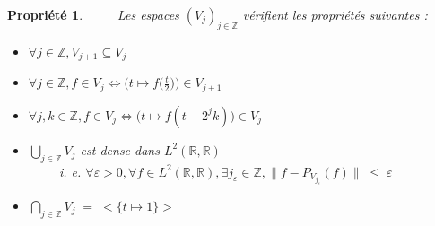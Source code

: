 \documentclass[a4paper,10pt]{report}
\theoremstyle{break}
\newtheorem{Prop}{Propri\'{e}t\'{e}}
\begin{document}
      \begin{Prop}
	$\phantom{Prop}$ Les espaces $(V_j)_{j \in \mathbb{Z}}$ v\'{e}rifient les propri\'{e}t\'{e}s suivantes :
	\begin{itemize}
	  \item[$(i)$] $ \forall j \in \mathbb{Z}, V_{j + 1} \subseteq V_j $
	  \item[$(ii)$] $ \forall j \in \mathbb{Z}, f \in V_j \Leftrightarrow \Big(t \mapsto f \big(\frac{t}{2} \big) \Big) \in V_{j + 1} $
	  \item[$(iii)$] $ \forall j, k \in \mathbb{Z}, f \in V_j \Leftrightarrow \big(t \mapsto f(t - 2^j k) \big) \in V_j $
	  \item[$(iv)$] $ \displaystyle \bigcup_{j \in \mathbb{Z}} V_j $ est dense dans $ L^2(\mathbb{R}, \mathbb{R}) $ \\
	      $\phantom{Prop}$ i. e. $ \forall \varepsilon > 0, \forall f \in L^2(\mathbb{R}, \mathbb{R}), \exists j_{\varepsilon} \in \mathbb{Z}, 
		\parallel f - P_{V_{j_{\varepsilon}}}(f) \parallel \; \leqslant \; \varepsilon $
	  \item[$(v)$] $ \displaystyle \bigcap_{j \in \mathbb{Z}} V_j \; = \; \Big< \big\{t \longmapsto 1 \big\} \Big> $
	\end{itemize}
      \end{Prop}
      
\end{document}
